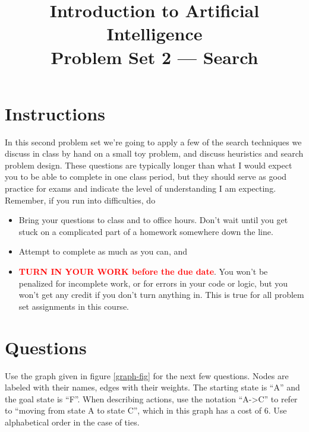 \documentclass{article} %
\title{Introduction to Artificial Intelligence\\ %
Problem Set 2 --- Search}
\date{} %
\author{}
\begin{document}
\maketitle %

\newcommand{\bphnote}[1]{\textit{\textcolor{red}{#1}}}


\section*{Instructions} %
In this second problem set we're going to apply a few of the search techniques we discuss in class by hand on a small toy problem, and discuss heuristics and search problem design. These questions are typically longer than what I would expect you to be able to complete in one class period, but they should serve as good practice for exams and indicate the level of understanding I am expecting. Remember, if you run into difficulties, do
\begin{itemize}
	\item Bring your questions to class and to office hours. Don't wait until you get stuck on a complicated part of a homework somewhere down the line.
	\item Attempt to complete as much as you can, and
	\item \textcolor{red}{\textbf{TURN IN YOUR WORK before the due date}}. You won't be penalized for incomplete work, or for errors in your code or logic, but you won't get any credit if you don't turn anything in. This is true for all problem set assignments in this course.
\end{itemize}

\section*{Questions}
Use the graph given in figure \ref{graph-fig} for the next few questions. Nodes are labeled with their names, edges with their weights. The starting state is ``A'' and the goal state is ``F''. When describing actions, use the notation ``A->C'' to refer to ``moving from state A to state C'', which in this graph has a cost of 6. Use alphabetical order in the case of ties.
\end{document}
